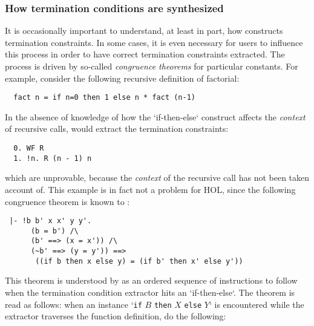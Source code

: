 \subsubsection{How termination conditions are synthesized}

It is occasionally important to understand, at least in part, how
 constructs termination constraints. In some cases, it is
even necessary for users to influence this process in order to have correct
termination constraints extracted. The process is driven by so-called
\emph{congruence theorems} for particular \HOL{} constants.
For example, consider the following recursive definition of factorial:
%
\begin{hol}
\begin{verbatim}
  fact n = if n=0 then 1 else n * fact (n-1)
\end{verbatim}
\end{hol}
%
In the absence of knowledge of how the `if-then-else` construct
affects the \emph{context} of recursive calls,  would
extract the termination constraints:
%
\begin{hol}
\begin{verbatim}
  0. WF R
  1. !n. R (n - 1) n
\end{verbatim}
\end{hol}
%
which are unprovable, because the \emph{context} of the recursive call has not
been taken account of. This example is in fact not a problem for HOL,
since the following congruence theorem is known to :
%
\begin{hol}
\begin{verbatim}
 |- !b b' x x' y y'.
      (b = b') /\
      (b' ==> (x = x')) /\
      (~b' ==> (y = y')) ==>
       ((if b then x else y) = (if b' then x' else y'))
\end{verbatim}
\end{hol}
%
This theorem is understood by  as an ordered sequence
of instructions to follow when the termination condition extractor
hits an `if-then-else`. The theorem is read as follows: when an
instance `\texttt{if} $B$ \texttt{then} $X$ \texttt{else} $Y$` is
encountered while the extractor traverses the function definition,
do the following:
